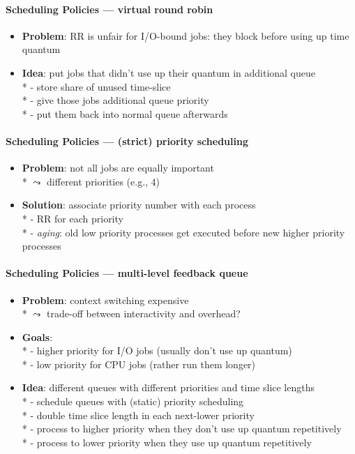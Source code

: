 \paragraph{Scheduling Policies --- virtual round robin}
\begin{itemize}
  \item \textbf{Problem}: RR is unfair for I/O-bound jobs: they block before using up time quantum
  \item \textbf{Idea}: put jobs that didn't use up their quantum in additional queue \\*
    - store share of unused time-slice \\*
    - give those jobs additional queue priority \\*
    - put them back into normal queue afterwards
\end{itemize}

\paragraph{Scheduling Policies --- (strict) priority scheduling}
\begin{itemize}
  \item \textbf{Problem}: not all jobs are equally important \\*
    \( \leadsto \) different priorities (e.g., 4)
  \item \textbf{Solution}: associate priority number with each process \\*
    - RR for each priority \\*
    - \emph{aging}: old low priority processes get executed before new higher priority processes
\end{itemize}

\paragraph{Scheduling Policies --- multi-level feedback queue}
\begin{itemize}
  \item \textbf{Problem}: context switching expensive \\*
    \( \leadsto \) trade-off between interactivity and overhead?
  \item \textbf{Goals}: \\*
    - higher priority for I/O jobs (usually don't use up quantum) \\*
    - low priority for CPU jobs (rather run them longer)
  \item \textbf{Idea}: different queues with different priorities and time slice lengths \\*
    - schedule queues with (static) priority scheduling \\*
    - double time slice length in each next-lower priority \\*
    - process to higher priority when they don't use up quantum repetitively \\*
    - process to lower priority when they use up quantum repetitively
\end{itemize}

